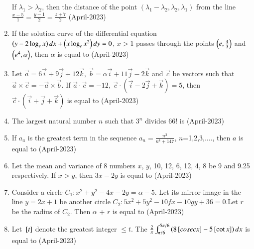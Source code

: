 \documentclass[journal]{IEEEtran}
\numberwithin{equation}{enumi}
\numberwithin{figure}{enumi}
\begin{document}
\begin{enumerate}[start=16]
If $\lambda_1 > \lambda_2$, then the distance of the point $(\lambda_1 - \lambda_2, \lambda_2, \lambda_1)$ 
from the line $\frac{x - 5}{1} = \frac{y - 1}{2} = \frac{z + 7}{2}$
\hfill(April-2023)
\item If the solution curve of the differential equation $\left(y - 2 \log_e x\right)dx + \left(x \log_e x^2\right)dy = 0$, $x > 1$ passes through the points $\left(e, \frac{4}{3}\right)$ and  $\left(e^4, \alpha\right)$, then $\alpha$ is equal to 
\hfill(April-2023)
\item Let \(\vec{a} = 6\vec{i} + 9\vec{j} + 12\vec{k}, \ \vec{b} = \alpha\vec{i} + 11\vec{j} - 2\vec{k}\) and \(\vec{c}\) be vectors such that \(\vec{a} \times \vec{c} = -\vec{a} \times \vec{b}\). If \(\vec{a} \cdot \vec{c} = -12, \ \vec{c} \cdot (\vec{i} - 2\vec{j} + \vec{k}) = 5\), then \(\vec{c} \cdot (\vec{i} + \vec{j} + \vec{k})\) is equal to 
\hfill(April-2023)
\item The largest natural number $n$ such that $3^n$ divides 66! is
\hfill(April-2023)
\item If $a_a$ is the greatest term in the sequence $a_n=\frac{n^3}{n^4 + 147}$, $n$=1,2,3,...., then $a$ is equal to 
\hfill(April-2023)
\item Let the mean and variance of 8 numbers $x$, $y$, 10, 12, 6, 12, 4, 8 be 9 and 9.25 respectively. If $x>y$, then $3x-2y$ is equal to 
\hfill(April-2023)
\item Consider a circle $C_1 : x^2+y^2-4x-2y=\alpha-5$. Let its mirror  image in the line $y=2x+1$ be another circle $C_2 : 5x^2+5y^2 -10fx-10gy+36=0 $.Let $r$ be the radius of $C_2$. Then $\alpha$ + $r$ is equal to
\hfill(April-2023)
\item Let ${}\left[t\right]$ denote the greatest integer $\leq t$. The $\frac{2}{\pi} \int_{\pi/6}^{5\pi/6} \left(8{}\left[cosec x\right] - 5{}\left[\cot x\right] \right) dx$ is equal to 
\hfill(April-2023)






\end{enumerate}
\end{document}
